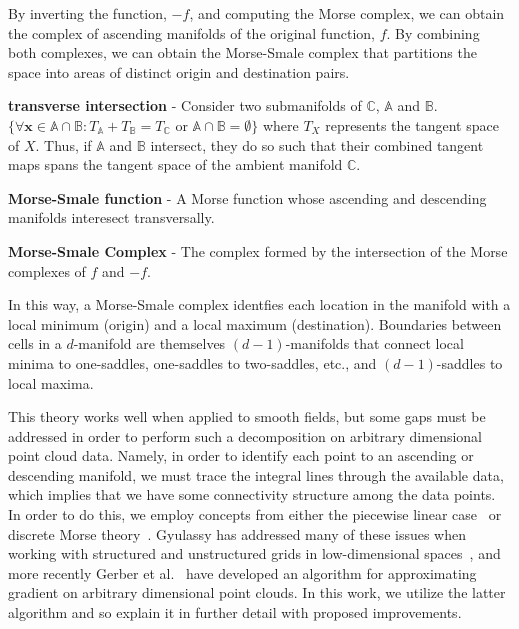 By inverting the function, $-f$, and computing the Morse complex, we can obtain the complex of ascending manifolds of the original function, $f$.
%
By combining both complexes, we can obtain the Morse-Smale complex that partitions the space into areas of distinct origin and destination pairs.


\begin{defn}
\textbf{transverse intersection} - Consider two submanifolds of $\mathbb{C}$, $\mathbb{A}$ and $\mathbb{B}$. $\{\forall \mathbf{x} \in \mathbb{A} \cap \mathbb{B}: T_{\mathbb{A}} + T_{\mathbb{B}} = T_{\mathbb{C}} \text{ or } \mathbb{A} \cap \mathbb{B} = \emptyset\}$ where $T_{X}$ represents the tangent space of $X$.
%
Thus, if $\mathbb{A}$ and $\mathbb{B}$ intersect, they do so such that their combined tangent maps spans the tangent space of the ambient manifold $\mathbb{C}$.
\end{defn}

\begin{defn}
\textbf{Morse-Smale function} - A Morse function whose ascending and descending manifolds interesect transversally.
\end{defn}

\begin{defn}
\textbf{Morse-Smale Complex} - The complex formed by the intersection of the Morse complexes of $f$ and $-f$.
\end{defn}

In this way, a Morse-Smale complex identfies each location in the manifold with a local minimum (origin) and a local maximum (destination).
%
Boundaries between cells in a $d$-manifold are themselves $(d-1)$-manifolds that connect local minima to one-saddles, one-saddles to two-saddles, etc., and $(d-1)$-saddles to local maxima.


This theory works well when applied to smooth fields, but some gaps must be addressed in order to perform such a decomposition on arbitrary dimensional point cloud data.
%
Namely, in order to identify each point to an ascending or descending manifold, we must trace the integral lines through the available data, which implies that we have some connectivity structure among the data points.
%
In order to do this, we employ concepts from either the piecewise linear case~\cite{EdelsbrunnerLetscherZomorodian2002} or discrete Morse theory~\cite{Forman2002}.
%
Gyulassy has addressed many of these issues when working with structured and unstructured grids in low-dimensional spaces~\cite{Gyulassy2008}, and more recently Gerber et al.~\cite{GerberBremerPascucci2010} have developed an algorithm for approximating gradient on arbitrary dimensional point clouds.
%
In this work, we utilize the latter algorithm and so explain it in further detail with proposed improvements.

